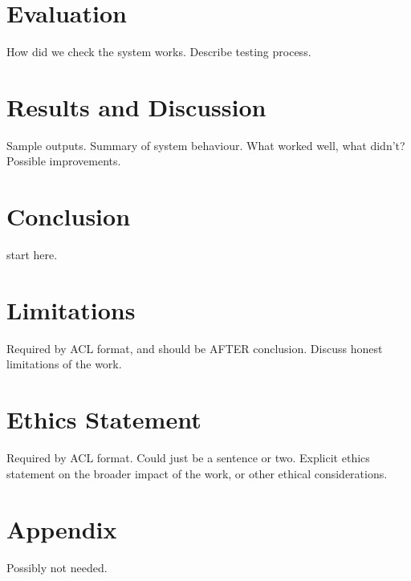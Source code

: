\documentclass[11pt]{article}
\begin{document}
\cite{Aliannejadi2019}

\section{Evaluation}
How did we check the system works.
Describe testing process.

\section{Results and Discussion}
Sample outputs.
Summary of system behaviour.
What worked well, what didn't?
Possible improvements.

\section{Conclusion}
start here.

\section*{Limitations}
Required by ACL format, and should be AFTER conclusion.
Discuss honest limitations of the work.

\section*{Ethics Statement}
Required by ACL format. Could just be a sentence or two.
Explicit ethics statement on the broader impact of the work, or other ethical considerations.




\appendix

\section{Appendix}
Possibly not needed.
\end{document}
